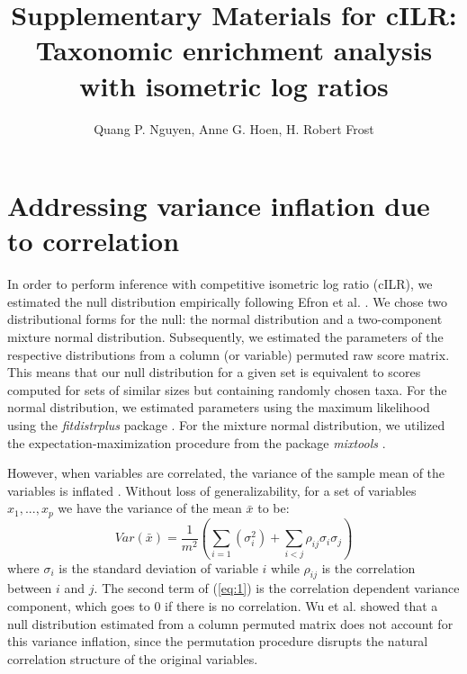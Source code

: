 \documentclass{article}
\title{Supplementary Materials for cILR: Taxonomic enrichment analysis with isometric log ratios}
\begin{document}
\author{Quang P. Nguyen, Anne G. Hoen, H. Robert Frost}
\maketitle
{}


\section{Addressing variance inflation due to correlation}
In order to perform inference with competitive isometric log ratio (cILR), we estimated the null distribution empirically following Efron et al. \cite{efron2004}. We chose two distributional forms for the null: the normal distribution and a two-component mixture normal distribution. Subsequently, we estimated the parameters of the respective distributions from a column (or variable) permuted raw score matrix. This means that our null distribution for a given set is equivalent to scores computed for sets of similar sizes but containing randomly chosen taxa. For the normal distribution, we estimated parameters using the maximum likelihood using the \emph{fitdistrplus} package \cite{delignette-muller2015}. For the mixture normal distribution, we utilized the expectation-maximization procedure from the package \emph{mixtools} \cite{benaglia2009}. 

However, when variables are correlated, the variance of the sample mean of the variables is inflated \cite{wu2012}. Without loss of generalizability, for a set of variables $x_1, ..., x_p$ we have the variance of the mean $\bar{x}$ to be:  
\begin{equation} \label{eq:1}
    Var(\bar{x}) = \frac{1}{m^2}\left(\sum_{i = 1}(\sigma_i^2) + \sum_{i < j}\rho_{ij}\sigma_i\sigma_j\right)
\end{equation}
where $\sigma_i$ is the standard deviation of variable $i$ while $\rho_{ij}$ is the correlation between $i$ and $j$. The second term of (\ref{eq:1}) is the correlation dependent variance component, which goes to 0 if there is no correlation. Wu et al. \cite{wu2012} showed that a null distribution estimated from a column permuted matrix does not account for this variance inflation, since the permutation procedure disrupts the natural correlation structure of the original variables. 
\end{document}
